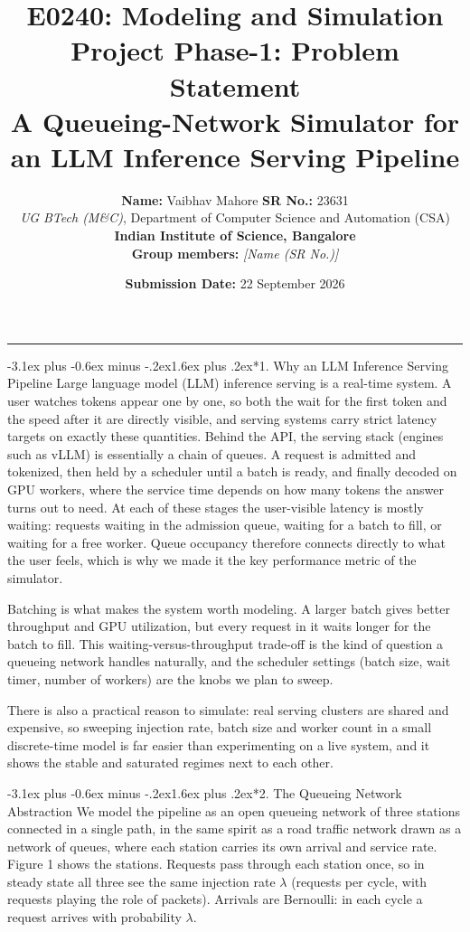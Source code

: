\documentclass[11pt,a4paper]{article}
\title{\vspace{-2.2em}\textbf{\huge E0240: Modeling and Simulation}\\[0.4em]
\Large \textbf{Project Phase-1: Problem Statement}\\[0.3em]
\large A Queueing-Network Simulator for an LLM Inference Serving Pipeline}
\author{\textbf{Name:} Vaibhav Mahore \quad \textbf{SR No.:} 23631\\[0.2em]
\textit{UG BTech (M\&C)}, Department of Computer Science and Automation (CSA)\\[0.2em]
\textbf{Indian Institute of Science, Bangalore}\\[0.2em]
\textbf{Group members:} \textit{[Name (SR No.)] \quad [Name (SR No.)]}}
\date{\textbf{Submission Date:} 22 September 2026}
\makeatletter
\renewcommand\section{\@startsection{section}{1}{\z@}%
  {-3.1ex plus -0.6ex minus -.2ex}{1.6ex plus .2ex}{\normalfont\Large\bfseries}}
\makeatother
\begin{document}
\maketitle
\vspace{-0.4em}
\hrule
\vspace{1.2em}

\section*{1. Why an LLM Inference Serving Pipeline}
Large language model (LLM) inference serving is a real-time system. A user watches
tokens appear one by one, so both the wait for the first token and the speed after
it are directly visible, and serving systems carry strict latency targets on
exactly these quantities. Behind the API, the serving stack (engines such as vLLM)
is essentially a chain of queues. A request is admitted and tokenized, then held by
a scheduler until a batch is ready, and finally decoded on GPU workers, where the
service time depends on how many tokens the answer turns out to need. At each of
these stages the user-visible latency is mostly waiting: requests waiting in the
admission queue, waiting for a batch to fill, or waiting for a free worker. Queue
occupancy therefore connects directly to what the user feels, which is why we made
it the key performance metric of the simulator.

Batching is what makes the system worth modeling. A larger batch gives better
throughput and GPU utilization, but every request in it waits longer for the batch
to fill. This waiting-versus-throughput trade-off is the kind of question a
queueing network handles naturally, and the scheduler settings (batch size, wait
timer, number of workers) are the knobs we plan to sweep.

There is also a practical reason to simulate: real serving clusters are shared and
expensive, so sweeping injection rate, batch size and worker count in a small
discrete-time model is far easier than experimenting on a live system, and it shows
the stable and saturated regimes next to each other.

\section*{2. The Queueing Network Abstraction}
We model the pipeline as an open queueing network of three stations connected in a
single path, in the same spirit as a road traffic network drawn as a network of
queues, where each station carries its own arrival and service rate. Figure 1
shows the stations. Requests pass through each station once, so in steady state all
three see the same injection rate $\lambda$ (requests per cycle, with requests
playing the role of packets). Arrivals are Bernoulli: in each cycle a request
arrives with probability $\lambda$.
\end{document}
